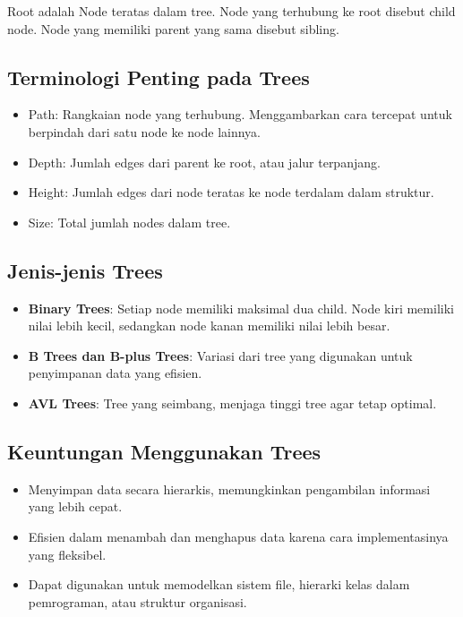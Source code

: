 \documentclass{article}
\begin{document}
Root adalah Node teratas dalam tree. Node yang terhubung ke root disebut child node. Node yang memiliki parent yang sama disebut sibling.

\subsection{Terminologi Penting pada Trees}
\begin{itemize}
    \item Path: Rangkaian node yang terhubung. Menggambarkan cara tercepat untuk berpindah dari satu node ke node lainnya.
    \item Depth: Jumlah edges dari parent ke root, atau jalur terpanjang.
    \item Height: Jumlah edges dari node teratas ke node terdalam dalam struktur.
    \item Size: Total jumlah nodes dalam tree.
\end{itemize}

\subsection{Jenis-jenis Trees}
\begin{itemize}
    \item \textbf{Binary Trees}: Setiap node memiliki maksimal dua child. Node kiri memiliki nilai lebih kecil, sedangkan node kanan memiliki nilai lebih besar.
    \item \textbf{B Trees dan B-plus Trees}: Variasi dari tree yang digunakan untuk penyimpanan data yang efisien.
    \item \textbf{AVL Trees}: Tree yang seimbang, menjaga tinggi tree agar tetap optimal.
\end{itemize}

\subsection{Keuntungan Menggunakan Trees}
\begin{itemize}
    \item Menyimpan data secara hierarkis, memungkinkan pengambilan informasi yang lebih cepat.
    \item Efisien dalam menambah dan menghapus data karena cara implementasinya yang fleksibel.
    \item Dapat digunakan untuk memodelkan sistem file, hierarki kelas dalam pemrograman, atau struktur organisasi.
\end{itemize}
\end{document}
